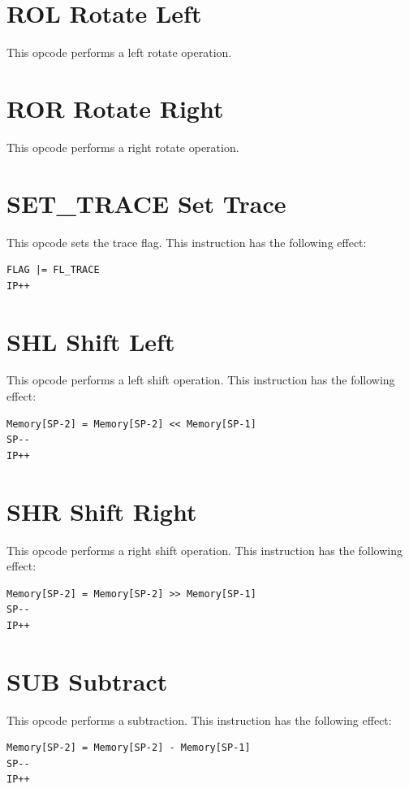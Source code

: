 \documentclass[11pt,a4paper,oneside]{book}
\begin{document}
\pagebreak
\section[ROL]{\texorpdfstring{ROL \hfill Rotate Left}{ROL -- Rotate Left}}
This opcode performs a left rotate operation.

\pagebreak
\section[ROR]{\texorpdfstring{ROR \hfill Rotate Right}{ROR -- Rotate Right}}
This opcode performs a right rotate operation.

\pagebreak
\section[SET\_TRACE]{\texorpdfstring{SET\_TRACE \hfill Set Trace}{SET\_TRACE -- Set Trace}}
This opcode sets the trace flag. This instruction has the following effect:
\begin{verbatim}
FLAG |= FL_TRACE
IP++
\end{verbatim}

\pagebreak
\section[SHL]{\texorpdfstring{SHL \hfill Shift Left}{SHL -- Shift Left}}
This opcode performs a left shift operation. This instruction has the following effect:
\begin{verbatim}
Memory[SP-2] = Memory[SP-2] << Memory[SP-1]
SP--
IP++
\end{verbatim}

\pagebreak
\section[SHR]{\texorpdfstring{SHR \hfill Shift Right}{SHR -- Shift Right}}
This opcode performs a right shift operation. This instruction has the following effect:
\begin{verbatim}
Memory[SP-2] = Memory[SP-2] >> Memory[SP-1]
SP--
IP++
\end{verbatim}

\pagebreak
\section[SUB]{\texorpdfstring{SUB \hfill Subtract}{SUB -- Subtract}}
This opcode performs a subtraction. This instruction has the following effect:
\begin{verbatim}
Memory[SP-2] = Memory[SP-2] - Memory[SP-1]
SP--
IP++
\end{verbatim}
\end{document}

